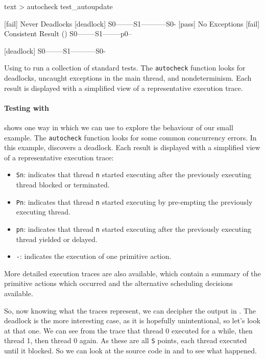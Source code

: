 \begin{listing}
\centering
\begin{cminted}{text}
> autocheck test_autoupdate

[fail] Never Deadlocks
        [deadlock] S0--------S1-----------S0-
[pass] No Exceptions
[fail] Consistent Result
        () S0--------S1--------p0--

        [deadlock] S0--------S1-----------S0-
\end{cminted}
\caption[Using \dejafu{} to run a collection of standard tests.]{Using \dejafu{} to run a collection of standard tests.  The \texttt{autocheck} function looks for deadlocks, uncaught exceptions in the main thread, and nondeterminism.  Each result is displayed with a simplified view of a representative execution trace.}\label{lst:autoupdate_example2}
\end{listing}

\paragraph{Testing with \dejafu{}}
 shows one way in which we can use
\dejafu{} to explore the behaviour of our small example.  The
\verb|autocheck| function looks for some common concurrency errors.
In this example, \dejafu{} discovers a deadlock.  Each result is
displayed with a simplified view of a representative execution trace:

\begin{itemize}
\item \verb|Sn|: indicates that thread \verb|n| started executing
  after the previously executing thread blocked or terminated.
\item \verb|Pn|: indicates that thread \verb|n| started executing by
  pre-empting the previously executing thread.
\item \verb|pn|: indicates that thread \verb|n| started executing
  after the previously executing thread yielded or delayed.
\item \verb|-|: indicates the execution of one primitive action.
\end{itemize}

More detailed execution traces are also available, which contain a
summary of the primitive actions which occurred and the alternative
scheduling decisions available.

So, now knowing what the traces represent, we can decipher the output
in .  The deadlock is the more
interesting case, as it is hopefully unintentional, so let's look at
that one.  We can see from the trace that thread 0 executed for a
while, then thread 1, then thread 0 again.  As these are all \verb|S|
points, each thread executed until it blocked.  So we can look at the
source code in  and
 to see what happened.

